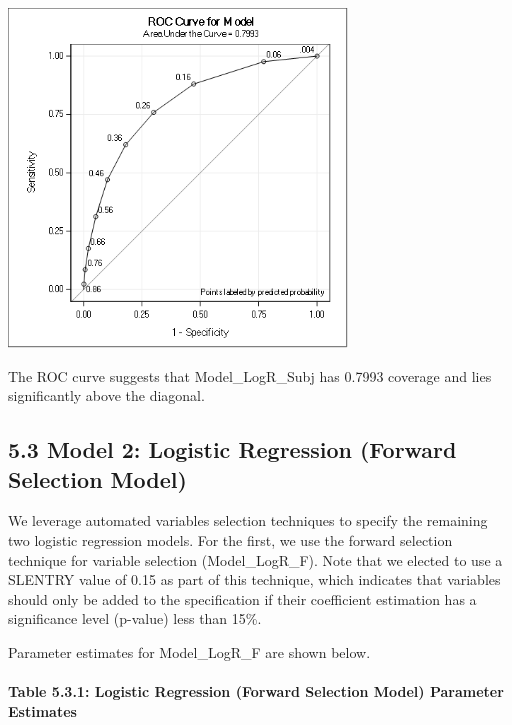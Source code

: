 \documentclass[]{article}
\let\oldparagraph\paragraph
\renewcommand{\paragraph}[1]{\oldparagraph{#1}\mbox{}}
\begin{document}
\includegraphics[height=3.54167in]{images/roc_subj.png}

The ROC curve suggests that Model\_LogR\_Subj has 0.7993 coverage and
lies significantly above the diagonal.

\subsection{5.3 Model 2: Logistic Regression (Forward Selection
Model)}\label{model-2-logistic-regression-forward-selection-model}

We leverage automated variables selection techniques to specify the
remaining two logistic regression models. For the first, we use the
forward selection technique for variable selection (Model\_LogR\_F).
Note that we elected to use a SLENTRY value of 0.15 as part of this
technique, which indicates that variables should only be added to the
specification if their coefficient estimation has a significance level
(p-value) less than 15\%.

Parameter estimates for Model\_LogR\_F are shown below.

\paragraph{Table 5.3.1: Logistic Regression (Forward Selection Model)
Parameter
Estimates}\label{table-5.3.1-logistic-regression-forward-selection-model-parameter-estimates}
\end{document}

